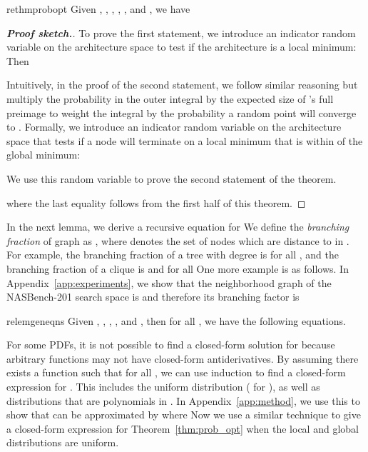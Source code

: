 \documentclass[11pt]{article}
\numberwithin{equation}{section}
\numberwithin{figure}{section}
\theoremstyle{plain}
\theoremstyle{definition}
\begin{document}
\begin{restatable}{rethm}{probopt}\label{thm:prob_opt}
Given , , , , , and , we have

\end{restatable}


\begin{proof}[\textbf{Proof sketch.}]



To prove the first statement,
we introduce an indicator random variable on the architecture space to test if the 
architecture is a local minimum:  Then

Intuitively, in the proof of the second statement, we follow similar reasoning but multiply
the probability in the outer integral by the expected size of 's full preimage to weight
the integral by the probability a random point will converge to .
Formally, we introduce an indicator random variable on the architecture space 
that tests if a node will terminate on a local minimum that is
within  of the global minimum:


We use this random variable to prove the second statement of the theorem.


where the last equality follows from the first half of this theorem.
\end{proof}

In the next lemma, we derive a recursive equation for 
We define the \emph{branching fraction} of graph  as ,
where  denotes the set of nodes which are distance  to  in .
For example, the branching fraction of a tree with degree  is  for all ,
and the branching fraction of a clique is  and  for all 
One more example is as follows.
In Appendix~\ref{app:experiments}, we show that the neighborhood graph of the
NASBench-201 search space is  and therefore its branching factor is


\begin{restatable}{relem}{geneqns}\label{lem:gen_eqns}
Given , , , , and ,
then for all , we have the following equations.

\end{restatable}

For some PDFs, it is not possible to find a closed-form solution
for  because arbitrary 
functions may not have closed-form antiderivatives.
By assuming there exists a function  such that  for all ,
we can use induction to find a closed-form expression for .
This includes the uniform distribution ( for ),
as well as distributions that are polynomials in .
In Appendix~\ref{app:method}, we use this to show that 
can be approximated by 
where 
Now we use a similar technique to give a closed-form expression for Theorem~\ref{thm:prob_opt}
when the local and global distributions are uniform.
\end{document}
